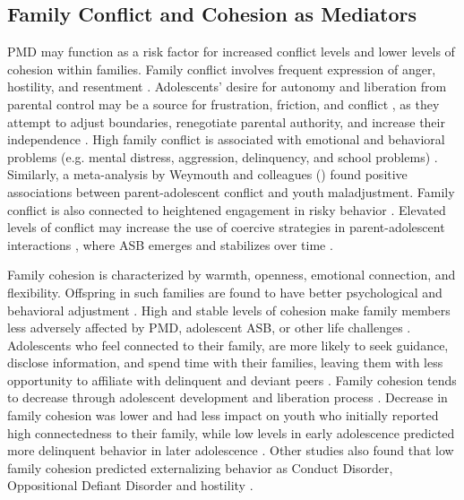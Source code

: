 \subsection{Family Conflict and Cohesion as Mediators}

PMD may function as a risk factor for increased conflict levels and lower levels of cohesion within families. Family conflict involves frequent expression of anger, hostility, and resentment \parencite{lobraico:2020}. Adolescents' desire for autonomy and liberation from parental control may be a source for frustration, friction, and conflict \parencite{buehler:2006, saxbe:2014}, as they attempt to adjust boundaries, renegotiate parental authority, and increase their independence \parencite{weymouth:2016}. High family conflict is associated with emotional and behavioral problems (e.g. mental distress, aggression, delinquency, and school problems) \parencite{fosco:2020, sun:2021, xu:2017}. Similarly, a meta-analysis by Weymouth and colleagues (\citeyear{weymouth:2016}) found positive associations between parent-adolescent conflict and youth maladjustment. Family conflict is also connected to heightened engagement in risky behavior \parencite{skinner:2016}. Elevated levels of conflict may increase the use of coercive strategies in parent-adolescent interactions \parencite{lobraico:2020}, where ASB emerges and stabilizes over time \parencite{granic:2006}.

Family cohesion is characterized by warmth, openness, emotional connection, and flexibility. Offspring in such families are found to have better psychological and behavioral adjustment \parencite{coe:2018, richmond:2006, sun:2021}. High and stable levels of cohesion make family members less adversely affected by PMD, adolescent ASB, or other life challenges \parencite{coe:2018}. Adolescents who feel connected to their family, are more likely to seek guidance, disclose information, and spend time with their families, leaving them with less opportunity to affiliate with delinquent and deviant peers \parencite{fosco:2019, vieno:2009}. Family cohesion tends to decrease through adolescent development and liberation process \parencite{baer:2002, dekovic:2003}. Decrease in family cohesion was lower and had less impact on youth who initially reported high connectedness to their family, while low levels in early adolescence predicted more delinquent behavior in later adolescence \parencite{lin:2019}. Other studies also found that low family cohesion predicted externalizing behavior as Conduct Disorder, Oppositional Defiant Disorder and hostility \parencite{coe:2018, richmond:2006}.

